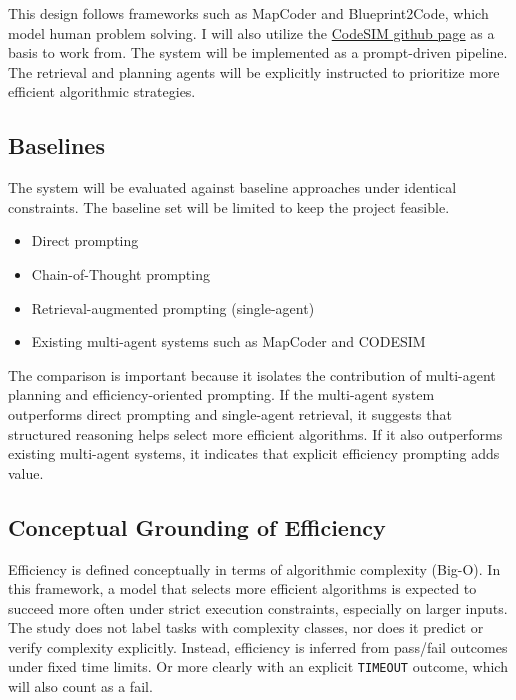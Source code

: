 \documentclass{article}
\begin{document}
This design follows frameworks such as MapCoder and Blueprint2Code, which model human problem solving. I will also utilize the \href{https://github.com/kagnlp/CodeGenerator}{CodeSIM github page} as a basis to work from.
The system will be implemented as a prompt-driven pipeline. The retrieval and planning agents will be explicitly instructed to prioritize more efficient algorithmic strategies.

\subsection*{Baselines}

The system will be evaluated against baseline approaches under identical constraints. The baseline set will be limited to keep the project feasible.

\begin{itemize}[noitemsep]
    \item Direct prompting
    \item Chain-of-Thought prompting
    \item Retrieval-augmented prompting (single-agent)
    \item Existing multi-agent systems such as MapCoder and CODESIM
\end{itemize}

The comparison is important because it isolates the contribution of multi-agent planning and efficiency-oriented prompting. If the multi-agent system outperforms direct prompting and single-agent retrieval, it suggests that structured reasoning helps select more efficient algorithms. If it also outperforms existing multi-agent systems, it indicates that explicit efficiency prompting adds value.

\subsection*{Conceptual Grounding of Efficiency}

Efficiency is defined conceptually in terms of algorithmic complexity (Big-O). In this framework, a model that selects more efficient algorithms is expected to succeed more often under strict execution constraints, especially on larger inputs. The study does not label tasks with complexity classes, nor does it predict or verify complexity explicitly. Instead, efficiency is inferred from pass/fail outcomes under fixed time limits. Or more clearly with an explicit \texttt{TIMEOUT} outcome, which will also count as a fail. 
\end{document}
